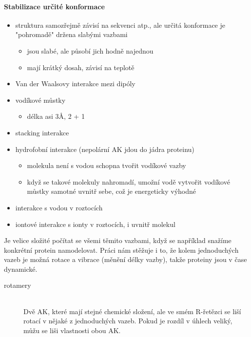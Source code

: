 \documentclass[DIV=8]{scrreprt}
\begin{document}
\paragraph{Stabilizace určité konformace}
\begin{itemize}[nosep]
    \item struktura samozřejmě závisí na sekvenci atp., ale určitá konformace je "pohromadě" držena slabými vazbami
\begin{itemize}[nosep]
    \item jsou slabé, ale působí jich hodně najednou
    \item mají krátký dosah, závisí na teplotě
\end{itemize}

    \item Van der Waalsovy interakce mezi dipóly
    \item vodíkové můstky
\begin{itemize}[nosep]
    \item délka asi 3Å, 2 + 1
\end{itemize}

    \item stacking interakce
    \item hydrofobní interakce (nepolární AK jdou do jádra proteinu)
\begin{itemize}[nosep]
    \item molekula není s vodou schopna tvořit vodíkové vazby
    \item když se takové molekuly nahromadí, umožní vodě vytvořit vodíkové můstky samotné uvnitř sebe, což je energeticky výhodné
\end{itemize}

    \item interakce s vodou v roztocích
    \item iontové interakce s ionty v roztocích, i uvnitř molekul
\end{itemize}



Je velice složité počítat se všemi těmito vazbami, když se například snažíme konkrétní protein namodelovat. Práci nám stěžuje i to, že kolem jednoduchých vazeb je možná rotace a vibrace (měnění délky vazby), takže proteiny jsou v čase dynamické.

\begin{description}
\item[rotamery]\hfill \\
Dvě AK, které mají stejné chemické složení, ale ve smém R-řetězci se liší rotací v nějaké z jednoduchých vazeb. Pokud je rozdíl v úhlech veliký, můžu se liši vlastnosti obou AK.

\end{description}
\end{document}
